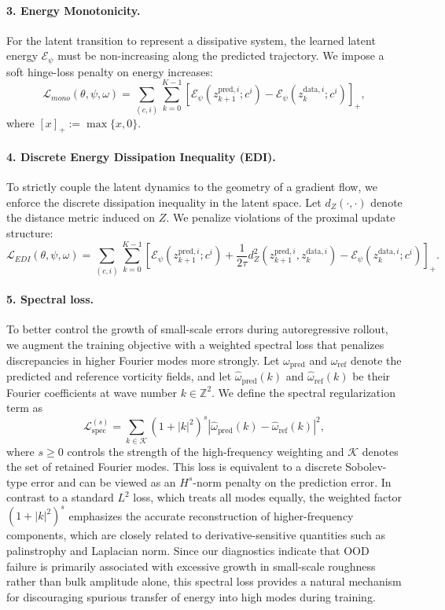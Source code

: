 \documentclass[11pt]{article}
\begin{document}
\paragraph{3. Energy Monotonicity.}
For the latent transition to represent a dissipative system, the learned latent energy $\mathcal{E}_\psi$ must be non-increasing along the predicted trajectory. We impose a soft hinge-loss penalty on energy increases:
$$ \mathcal{L}_{mono}(\theta, \psi, \omega) = \sum_{(c,i)} \sum_{k=0}^{K-1} \left[ \mathcal{E}_\psi(z_{k+1}^{\text{pred},i}; c^i) - \mathcal{E}_\psi(z_k^{\text{data},i}; c^i) \right]_+, $$
where $[x]_+ := \max\{x, 0\}$.

\paragraph{4. Discrete Energy Dissipation Inequality (EDI).}
To strictly couple the latent dynamics to the geometry of a gradient flow, we enforce the discrete dissipation inequality in the latent space. Let $d_Z(\cdot, \cdot)$ denote the distance metric induced on $Z$. We penalize violations of the proximal update structure:
$$ \mathcal{L}_{EDI}(\theta, \psi, \omega) = \sum_{(c,i)} \sum_{k=0}^{K-1} \left[\mathcal{E}_\psi(z_{k+1}^{\text{pred},i}; c^i) + \frac{1}{2\tau} d_Z^2(z_{k+1}^{\text{pred},i}, z_k^{\text{data},i}) - \mathcal{E}_\psi(z_k^{\text{data},i}; c^i) \right]_+. $$

\paragraph{5. Spectral loss.} To better control the growth of small-scale errors during autoregressive rollout, we augment the training objective with a weighted spectral loss that penalizes discrepancies in higher Fourier modes more strongly. Let $\omega_{\mathrm{pred}}$ and $\omega_{\mathrm{ref}}$ denote the predicted and reference vorticity fields, and let $\widehat{\omega}_{\mathrm{pred}}(k)$ and $\widehat{\omega}_{\mathrm{ref}}(k)$ be their Fourier coefficients at wave number $k \in \mathbb{Z}^2$. We define the spectral regularization term as
\begin{equation}
\mathcal{L}_{\mathrm{spec}}^{(s)}
=
\sum_{k \in \mathcal{K}}
(1+|k|^2)^s
\left|
\widehat{\omega}_{\mathrm{pred}}(k)-\widehat{\omega}_{\mathrm{ref}}(k)
\right|^2,
\label{eq:spectral_loss}
\end{equation}
where $s \ge 0$ controls the strength of the high-frequency weighting and $\mathcal{K}$ denotes the set of retained Fourier modes. This loss is equivalent to a discrete Sobolev-type error and can be viewed as an $H^s$-norm penalty on the prediction error. In contrast to a standard $L^2$ loss, which treats all modes equally, the weighted factor $(1+|k|^2)^s$ emphasizes the accurate reconstruction of higher-frequency components, which are closely related to derivative-sensitive quantities such as palinstrophy and Laplacian norm. Since our diagnostics indicate that OOD failure is primarily associated with excessive growth in small-scale roughness rather than bulk amplitude alone, this spectral loss provides a natural mechanism for discouraging spurious transfer of energy into high modes during training.
\end{document}
